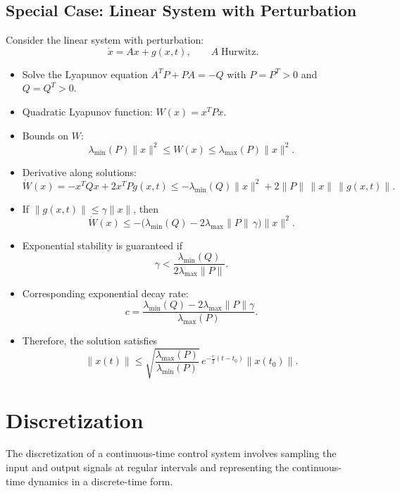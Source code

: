 \subsection{Special Case: Linear System with Perturbation}

Consider the linear system with perturbation:
\[
\dot{x} = A x + g(x,t), \qquad A \;\text{Hurwitz}.
\]

\begin{itemize}
    \item Solve the Lyapunov equation \(A^T P + P A = -Q\) with \(P=P^T>0\) and \(Q=Q^T>0\).  
    \item Quadratic Lyapunov function: \(W(x) = x^T P x\).  
    \item Bounds on \(W\):
    \[
    \lambda_{\min}(P)\|x\|^2 \le W(x) \le \lambda_{\max}(P)\|x\|^2.
    \]
    \item Derivative along solutions:
    \[
    \dot W(x) = -x^T Q x + 2 x^T P g(x,t) \le -\lambda_{\min}(Q)\|x\|^2 + 2\|P\|\,\|x\|\,\|g(x,t)\|.
    \]
    \item If \(\|g(x,t)\| \le \gamma \|x\|\), then
    \[
    \dot W(x) \le -\big(\lambda_{\min}(Q) - 2 \lambda_{\max}\|P\|\, \gamma \big) \|x\|^2.
    \]
    \item Exponential stability is guaranteed if
    \[
    \gamma < \frac{\lambda_{\min}(Q)}{2 \lambda_{\max}\|P\|}.
    \]
    \item Corresponding exponential decay rate:
    \[
    c = \frac{\lambda_{\min}(Q) - 2 \lambda_{\max}\|P\| \gamma}{\lambda_{\max}(P)}.
    \]
    \item Therefore, the solution satisfies
    \[
    \|x(t)\| \le \sqrt{\frac{\lambda_{\max}(P)}{\lambda_{\min}(P)}} 
    \, e^{-\tfrac{c}{2}(t-t_0)} \|x(t_0)\|.
    \]
\end{itemize}

\section{Discretization}

The discretization of a continuous-time control system involves sampling the input and output signals at regular intervals and representing the continuous-time dynamics in a discrete-time form.

\begin{center}
\end{center}

